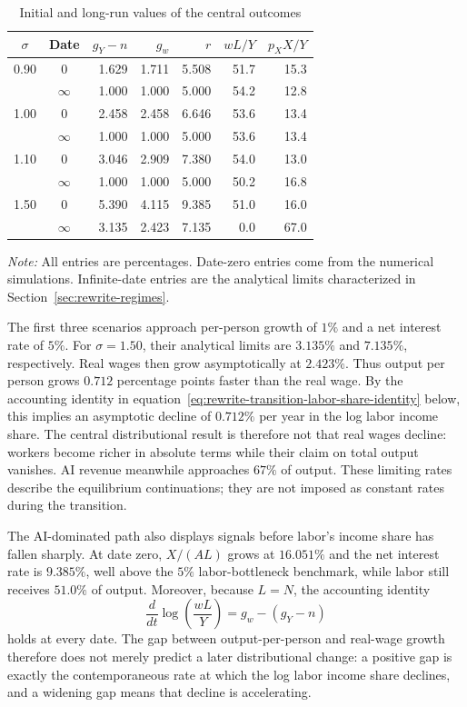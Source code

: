 \begin{table}[H]
\centering
\caption{Initial and long-run values of the central outcomes}
\label{tab:rewrite-central-path-values}
\small
\setlength{\tabcolsep}{5pt}
\begin{tabular}{ccrrrrr}
\toprule
$\sigma$ & Date & $g_Y-n$ & $g_w$ & $r$ & $wL/Y$ & $p_XX/Y$\\
\midrule
0.90 & $0$      & 1.629 & 1.711 & 5.508 & 51.7 & 15.3\\
     & $\infty$ & 1.000 & 1.000 & 5.000 & 54.2 & 12.8\\
1.00 & $0$      & 2.458 & 2.458 & 6.646 & 53.6 & 13.4\\
     & $\infty$ & 1.000 & 1.000 & 5.000 & 53.6 & 13.4\\
1.10 & $0$      & 3.046 & 2.909 & 7.380 & 54.0 & 13.0\\
     & $\infty$ & 1.000 & 1.000 & 5.000 & 50.2 & 16.8\\
1.50 & $0$      & 5.390 & 4.115 & 9.385 & 51.0 & 16.0\\
     & $\infty$ & 3.135 & 2.423 & 7.135 & 0.0 & 67.0\\
\bottomrule
\end{tabular}

\vspace{2pt}
\parbox{0.94\textwidth}{\footnotesize\emph{Note:} All entries are percentages.
Date-zero entries come from the numerical simulations. Infinite-date
entries are the analytical limits characterized in Section~\ref{sec:rewrite-regimes}.}
\end{table}

The first three scenarios approach per-person growth of $1\%$ and a net
interest rate of $5\%$. For $\sigma=1.50$, their analytical limits are
$3.135\%$ and $7.135\%$, respectively. Real wages then grow asymptotically
at $2.423\%$. Thus output per person grows $0.712$ percentage points faster
than the real wage. By the accounting identity in
equation~\eqref{eq:rewrite-transition-labor-share-identity} below, this implies an asymptotic decline of
$0.712\%$ per year in the log labor income
share. The central distributional result is therefore not that real wages decline:
workers become richer in absolute terms while their claim on total output
vanishes. AI revenue meanwhile approaches $67\%$ of output. These limiting
rates describe the equilibrium continuations; they are not imposed as
constant rates during the transition.

The AI-dominated path also displays signals before labor's income share has
fallen sharply. At date zero, $X/(AL)$ grows at $16.051\%$ and the net interest
rate is $9.385\%$, well above the $5\%$ labor-bottleneck benchmark, while labor
still receives $51.0\%$ of output. Moreover, because $L=N$, the accounting
identity
\begin{equation}
 \frac{d}{dt}\log\!\left(\frac{wL}{Y}\right)
 =g_w-(g_Y-n)
 \label{eq:rewrite-transition-labor-share-identity}
\end{equation}
holds at every date. The gap between output-per-person and real-wage growth
therefore does not merely predict a later distributional change: a positive
gap is exactly the contemporaneous rate at which the log labor income share
declines, and a widening gap means that decline is accelerating.


